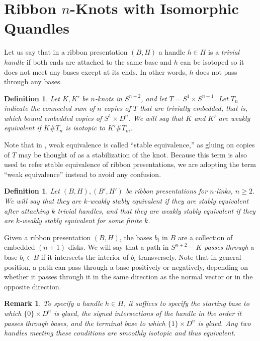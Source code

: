 \documentclass{amsart}
\newtheorem{remark}[theorem]{Remark}
\newtheorem{definition}[theorem]{Definition}
\begin{document}
%
\section{Ribbon $n$-Knots with Isomorphic Quandles}
\label{s-Ribbon-Isom-Q}
%

Let us say that in a ribbon presentation $(B, H)$ a handle $h\in H$ is a \emph{trivial handle} if both ends are attached to the same base and $h$ can be isotoped so it does not meet any bases except at its ends. In other words, $h$ does not pass through any bases.

\begin{definition}
Let $K, K'$ be $n$-knots in $S^{n+2}$, and let $T=S^1\times S^{n-1}$. Let $T_n$ indicate the connected sum of $n$ copies of $T$ that are trivially embedded, that is, which bound embedded copies of $S^1\times D^{n}$. We will say that $K$ and $K'$ are \emph{weakly equivalent} if $K\# T_n$ is isotopic to $K'\# T_m$.
\end{definition}

Note that in \cite{Liv}, weak equivalence is called ``stable equivalence,'' as gluing on copies of $T$ may be thought of as a stabilization of the knot. Because this term is also used to refer stable equivalence of ribbon presentations, we are adopting the term ``weak equivalence'' instead to avoid any confusion.

\begin{definition}
Let $(B, H), (B', H')$ be ribbon presentations for $n$-links, $n\geq 2$. We will say that they are \emph{$k$-weakly stably equivalent} if they are stably equivalent after attaching $k$ trivial handles, and that they are \emph{weakly stably equivalent} if they are $k$-weakly stably equivalent for some finite $k$.
\end{definition}

Given a ribbon presentation $(B, H)$, the bases $b_i$ in $B$ are a collection of embedded $(n+1)$ disks. We will say that a path in $S^{n+2}-K$ \emph{passes through} a base $b_i\in B$ if it intersects the interior of $b_i$ transversely. Note that in general position, a path can pass through a base positively or negatively, depending on whether it passes through it in the same direction as the normal vector or in the opposite direction.

\begin{remark}
To specify a handle $h\in H$, it suffices to specify the starting base to which $\{ 0\} \times D^n$ is glued, the signed intersections of the handle in the order it passes through bases, and the terminal base to which $\{ 1\} \times D^n$ is glued. Any two handles meeting these conditions are smoothly isotopic and thus equivalent.
\end{remark}
\end{document}
